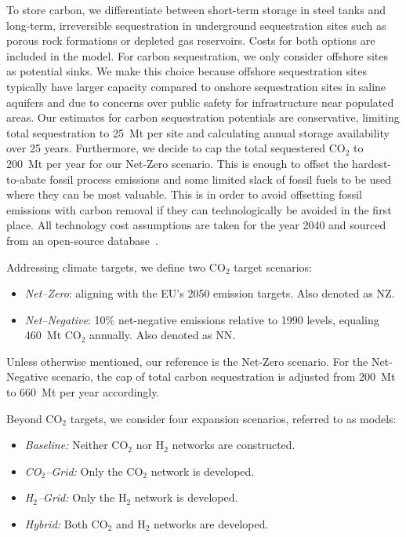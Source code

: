 \documentclass[twocolumn]{article}
\newcommand{\carbon}{CO$_2$}
\newcommand{\hydrogen}{H$_2$}
\newcommand{\carbongrid}{\carbon{}--Grid}
\newcommand{\hydrogengrid}{\hydrogen{}--Grid}
\begin{document}
To store carbon, we differentiate between short-term storage in steel tanks and long-term, irreversible sequestration in underground sequestration sites such as porous rock formations or depleted gas reservoirs. Costs for both options are included in the model. For carbon sequestration, we only consider offshore sites as potential sinks. We make this choice because offshore sequestration sites typically have larger capacity compared to onshore sequestration sites in saline aquifers and due to concerns over public safety for infrastructure near populated areas. Our estimates for carbon sequestration potentials are conservative, limiting total sequestration to 25~Mt per site and calculating annual storage availability over 25 years. Furthermore, we decide to cap the total sequestered \carbon{} to 200~Mt per year for our Net-Zero scenario. This is enough to offset the hardest-to-abate fossil process emissions and some limited slack of fossil fuels to be used where they can be most valuable. This is in order to avoid offsetting fossil emissions with carbon removal if they can technologically be avoided in the first place. All technology cost assumptions are taken for the year 2040 and sourced from an open-source database~\cite{lisazeyenPyPSATechnologydataTechnology2023}.


Addressing climate targets, we define two \carbon{} target scenarios:
\begin{itemize}
    \item[] \textit{Net--Zero}: aligning with the EU's 2050 emission targets. Also denoted as NZ.
    \item[] \textit{Net--Negative}: 10\% net-negative emissions relative to 1990 levels, equaling 460~Mt \carbon{} annually. Also denoted as NN.
\end{itemize}
Unless otherwise mentioned, our reference is the Net-Zero scenario. For the Net-Negative scenario, the cap of total carbon sequestration is adjusted from 200~Mt to 660~Mt per year accordingly.

Beyond \carbon{} targets, we consider four expansion scenarios, referred to as models:
\begin{itemize}
    \item[] \textit{Baseline:} Neither \carbon{} nor \hydrogen{} networks are constructed.
    \item[] \textit{\carbongrid:} Only the \carbon{} network is developed.
    \item[] \textit{\hydrogengrid:} Only the \hydrogen{} network is developed.
    \item[] \textit{Hybrid:} Both \carbon{} and \hydrogen{} networks are developed.
\end{itemize}
\end{document}

